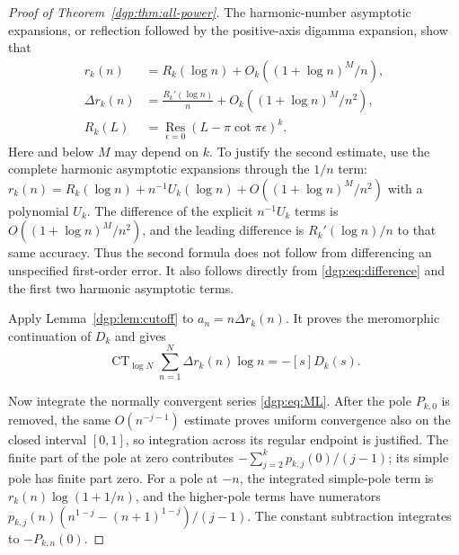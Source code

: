 \begin{proof}[Proof of Theorem~\ref{dgp:thm:all-power}]
The harmonic-number asymptotic expansions, or reflection followed by
the positive-axis digamma expansion, show that
\begin{align}
 r_k(n)&=R_k(\log n)+O_k((1+\log n)^M/n),\label{dgp:eq:r-asymptotic}\\
 \Delta r_k(n)&=\frac{R_k'(\log n)}n
                  +O_k((1+\log n)^M/n^2),\label{dgp:eq:delta-asymptotic}\\
 R_k(L)&=\operatorname*{Res}_{\epsilon=0}(L-\pi\cot\pi\epsilon)^k.
 \label{dgp:eq:Rdefinition}
\end{align}
Here and below $M$ may depend on $k$.  To justify the second estimate,
use the complete harmonic asymptotic expansions through the $1/n$
term: $r_k(n)=R_k(\log n)+n^{-1}U_k(\log n)
+O((1+\log n)^M/n^2)$ with a polynomial $U_k$.  The difference of
the explicit $n^{-1}U_k$ terms is $O((1+\log n)^M/n^2)$, and
the leading difference is $R_k'(\log n)/n$ to that same accuracy.
Thus the second formula does not follow from differencing an
unspecified first-order error.  It also follows directly from
\eqref{dgp:eq:difference} and the first two harmonic asymptotic terms.

Apply Lemma~\ref{dgp:lem:cutoff} to $a_n=n\Delta r_k(n)$.
It proves the meromorphic continuation of $D_k$ and gives
\begin{equation}
 \operatorname{CT}_{\log N}\sum_{n=1}^N\Delta r_k(n)\log n=-[s]D_k(s).
 \label{dgp:eq:delta-cutoff}
\end{equation}

Now integrate the normally convergent series \eqref{dgp:eq:ML}.
After the pole $P_{k,0}$ is removed, the same
$O(n^{-j-1})$ estimate proves uniform convergence also on the
closed interval $[0,1]$, so integration across its regular
endpoint is justified.
The finite part of the pole at zero contributes
$-\sum_{j=2}^kp_{k,j}(0)/(j-1)$; its simple pole has finite part
zero.  For a pole at $-n$, the integrated simple-pole term is
$r_k(n)\log(1+1/n)$, and the higher-pole terms have numerators
$p_{k,j}(n)(n^{1-j}-(n+1)^{1-j})/(j-1)$.
The constant subtraction integrates to $-P_{k,n}(0)$.


\end{proof}
